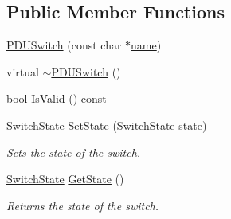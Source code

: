 \subsection*{Public Member Functions}
\begin{DoxyCompactItemize}
\item 
\hyperlink{classcubesat_1_1PDUSwitch_a025fa4903a5ae0044948a1c0dc608674}{P\+D\+U\+Switch} (const char $\ast$\hyperlink{classcubesat_1_1PDUSwitch_a2e3a4106c80a9151f795ca3ede55c64f}{name})
\item 
virtual \hyperlink{classcubesat_1_1PDUSwitch_a793dcaa10a20d99985d60d5f432fcbb7}{$\sim$\+P\+D\+U\+Switch} ()
\item 
bool \hyperlink{classcubesat_1_1PDUSwitch_a4312e39a47e11819759e0b0c2d4ab9fe}{Is\+Valid} () const
\item 
\hyperlink{namespacecubesat_a61ab3c9f315851c6eaaf5ad28f97f2e3}{Switch\+State} \hyperlink{classcubesat_1_1PDUSwitch_aca5fd10f2f780e96a5f3cd8601cb21d5}{Set\+State} (\hyperlink{namespacecubesat_a61ab3c9f315851c6eaaf5ad28f97f2e3}{Switch\+State} state)
\begin{DoxyCompactList}\small\item\em Sets the state of the switch. \end{DoxyCompactList}\item 
\hyperlink{namespacecubesat_a61ab3c9f315851c6eaaf5ad28f97f2e3}{Switch\+State} \hyperlink{classcubesat_1_1PDUSwitch_aff0ea06469487418b2fa0e865b74b248}{Get\+State} ()
\begin{DoxyCompactList}\small\item\em Returns the state of the switch. \end{DoxyCompactList}\end{DoxyCompactItemize}
